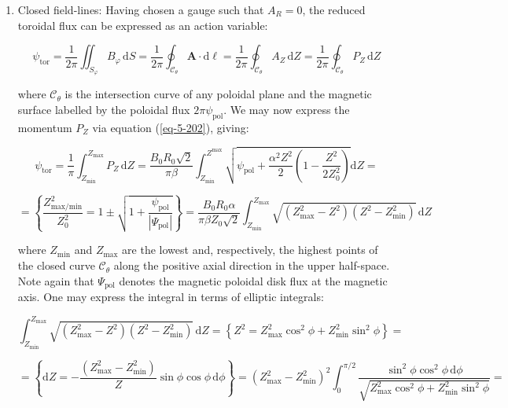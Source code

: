 \begin{enumerate}
    \item Closed field-lines: Having chosen a gauge such that $A_R=0$, the reduced toroidal flux can be expressed as an action variable:

    \begin{equation}
        \psi_\text{tor}=\frac{1}{2\pi}\iint_{S_\varphi}B_\varphi\,\mathrm{d}S=\frac{1}{2\pi}\oint_{\mathcal{C}_\theta}\mathbf{A}\cdot\mathrm{d}\boldsymbol{\ell}=\frac{1}{2\pi}\oint_{\mathcal{C}_\theta}A_Z\,\mathrm{d}Z=\frac{1}{2\pi}\oint_{\mathcal{C}_\theta}P_Z\,\mathrm{d}Z
    \end{equation}

    where $\mathcal{C}_\theta$ is the intersection curve of any poloidal plane and the magnetic surface labelled by the poloidal flux $2\pi\psi_\text{pol}$. We may now express the momentum $P_Z$ via equation (\ref{eq-5-202}), giving:

    \begin{equation*}
        \psi_\text{tor}=\frac{1}{\pi}\int_{Z_\text{min}}^{Z_\text{max}}P_Z\,\mathrm{d}Z=\frac{B_0R_0\sqrt{2}}{\pi\beta}\int_{Z_\text{min}}^{Z^\text{max}}\sqrt{\psi_\text{pol}+\frac{\alpha^2Z^2}{2}\left(1-\frac{Z^2}{2Z_0^2}\right)}\mathrm{d}Z=
    \end{equation*}
    
    \begin{equation}
        \label{eq-x-8-25}
        =\left\{\frac{Z_\text{max/min}^2}{Z_0^2}=1\pm\sqrt{1+\frac{\psi_\text{pol}}{|\Psi_\text{pol}|}}\right\}=\frac{B_0R_0\alpha}{\pi\beta Z_0\sqrt{2}}\int_{Z_\text{min}}^{Z_\text{max}}\sqrt{(Z_\text{max}^2-Z^2)(Z^2-Z_\text{min}^2)}\,\mathrm{d}Z
    \end{equation}

    where $Z_\text{min}$ and $Z_\text{max}$ are the lowest and, respectively, the highest points of the closed curve $\mathcal{C}_\theta$ along the positive axial direction in the upper half-space. Note again that $\Psi_\text{pol}$ denotes the magnetic poloidal disk flux at the magnetic axis. One may express the integral in terms of elliptic integrals:

    \begin{equation*}
        \int_{Z_\text{min}}^{Z_\text{max}}\sqrt{(Z_\text{max}^2-Z^2)(Z^2-Z_\text{min}^2)}\,\text{d}Z=\left\{Z^2=Z_\text{max}^2\cos^2{\phi}+Z_\text{min}^2\sin^2{\phi}\right\}=
    \end{equation*}

    \begin{equation*}
        =\left\{\mathrm{d}Z=-\frac{(Z_\text{max}^2-Z_\text{min}^2)}{Z}\sin{\phi}\cos{\phi}\,\mathrm{d}\phi\right\}=(Z_\text{max}^2-Z_\text{min}^2)^2\int_0^{\pi/2}\frac{\sin^2{\phi}\cos^2{\phi}\,\text{d}\phi}{\sqrt{Z_\text{max}^2\cos^2{\phi}+Z_\text{min}^2\sin^2{\phi}}}=
    \end{equation*}


\end{enumerate}
